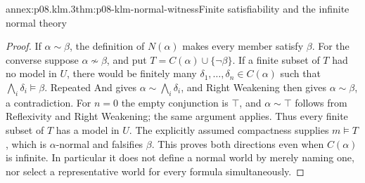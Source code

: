 \begin{annexitem}{annex:p08.klm.3}{thm:p08-klm-normal-witness}{Finite satisfiability and the infinite normal theory}
\begin{proof}
If \(\alpha\sim\beta\), the definition of \(N(\alpha)\) makes
every member satisfy \(\beta\). For the converse suppose
\(\alpha\not\sim\beta\), and put
\(T=C(\alpha)\cup\{\neg\beta\}\).
If a finite subset of \(T\) had no model in \(U\), there would
be finitely many \(\delta_1,\ldots,\delta_n\in C(\alpha)\) such
that \(\bigwedge_i\delta_i\models\beta\).
Repeated And gives \(\alpha\sim\bigwedge_i\delta_i\), and Right
Weakening then gives \(\alpha\sim\beta\), a contradiction.
For \(n=0\) the empty conjunction is \(\top\), and
\(\alpha\sim\top\) follows from Reflexivity and Right Weakening;
the same argument applies.
Thus every finite subset of \(T\) has a model in \(U\).
The explicitly assumed compactness supplies \(m\models T\), which
is \(\alpha\)-normal and falsifies \(\beta\). This proves both
directions even when \(C(\alpha)\) is infinite. In particular it
does not define a normal world by merely naming one, nor select a
representative world for every formula simultaneously.
\end{proof}
\end{annexitem}

